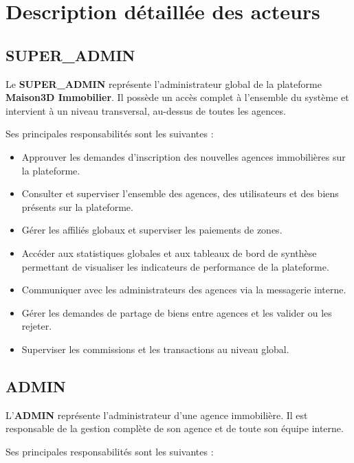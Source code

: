 \documentclass[a4paper,12pt]{report}
\begin{document}

\section{Description détaillée des acteurs}

\subsection{SUPER\_ADMIN}

Le \textbf{SUPER\_ADMIN} représente l'administrateur global de la plateforme \textbf{Maison3D Immobilier}. Il possède un accès complet à l'ensemble du système et intervient à un niveau transversal, au-dessus de toutes les agences.

Ses principales responsabilités sont les suivantes :

\begin{itemize}
    \item Approuver les demandes d'inscription des nouvelles agences immobilières sur la plateforme.
    \item Consulter et superviser l'ensemble des agences, des utilisateurs et des biens présents sur la plateforme.
    \item Gérer les affiliés globaux et superviser les paiements de zones.
    \item Accéder aux statistiques globales et aux tableaux de bord de synthèse permettant de visualiser les indicateurs de performance de la plateforme.
    \item Communiquer avec les administrateurs des agences via la messagerie interne.
    \item Gérer les demandes de partage de biens entre agences et les valider ou les rejeter.
    \item Superviser les commissions et les transactions au niveau global.
\end{itemize}

\subsection{ADMIN}

L'\textbf{ADMIN} représente l'administrateur d'une agence immobilière. Il est responsable de la gestion complète de son agence et de toute son équipe interne.

Ses principales responsabilités sont les suivantes :
\end{document}
